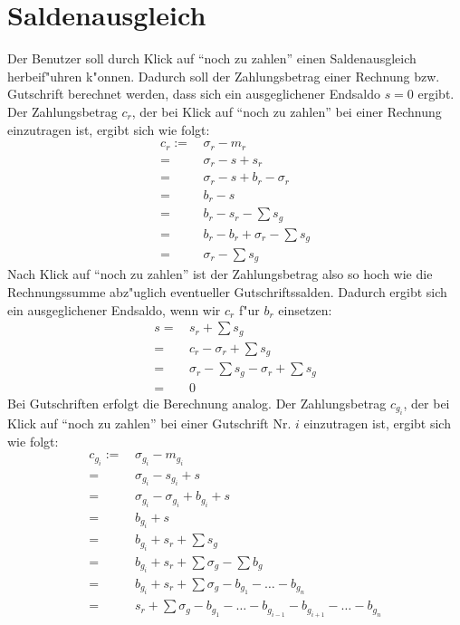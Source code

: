 \documentclass[a4paper]{article}
\numberwithin{equation}{section}
\begin{document}
\section{Saldenausgleich}
Der Benutzer soll durch Klick auf "`noch zu zahlen"' einen Saldenausgleich
herbeif"uhren k"onnen. Dadurch soll der Zahlungsbetrag einer Rechnung bzw.
Gutschrift berechnet werden, dass sich ein ausgeglichener Endsaldo $s = 0$
ergibt.
Der Zahlungsbetrag $c_r$, der bei Klick auf "`noch zu zahlen"' bei einer 
Rechnung einzutragen ist, ergibt sich wie folgt:
\begin{equation}
\begin{split}
  c_r := & \,\sigma_r - m_r \\
    = & \,\sigma_r - s + s_r \\
    = & \,\sigma_r - s + b_r - \sigma_r \\
    = & \,b_r - s \\
    = & \,b_r - s_r - \sum s_g \\
    = & \,b_r - b_r + \sigma_r - \sum s_g \\
    = & \,\sigma_r - \sum s_g 
\end{split}
\end{equation}
Nach Klick auf "`noch zu zahlen"' ist der Zahlungsbetrag also so hoch wie die
Rechnungssumme abz"uglich eventueller Gutschriftssalden. Dadurch ergibt sich
ein ausgeglichener Endsaldo, wenn wir $c_r$ f"ur $b_r$ einsetzen:
\begin{equation}
\begin{split}
  s = & \,s_r + \sum s_g \\
    = & \,c_r - \sigma_r + \sum s_g \\
    = & \,\sigma_r - \sum s_g - \sigma_r + \sum s_g \\
    = & \,0
\end{split}
\end{equation}
Bei Gutschriften erfolgt die Berechnung analog. Der Zahlungsbetrag $c_{g_i}$, 
der bei Klick auf "`noch zu zahlen"' bei einer Gutschrift Nr. $i$ einzutragen 
ist, ergibt sich wie folgt:
\begin{equation}
\begin{split}
  c_{g_i} := & \,\sigma_{g_i} - m_{g_i} \\
    = & \,\sigma_{g_i} - s_{g_i} + s \\
    = & \,\sigma_{g_i} - \sigma_{g_i} + b_{g_i} + s \\
    = & \,b_{g_i} + s \\
    = & \,b_{g_i} + s_r + \sum s_g \\
    = & \,b_{g_i} + s_r + \sum \sigma_g - \sum b_g \\
    = & \,b_{g_i} + s_r + \sum \sigma_g - b_{g_1} - \ldots - b_{g_n} \\
    = & \,s_r + \sum \sigma_g - b_{g_1} - \ldots - b_{g_{i-1}} - b_{g_{i+1}} - 
      \ldots - b_{g_n} \\
\end{split}
\end{equation}
\end{document}
